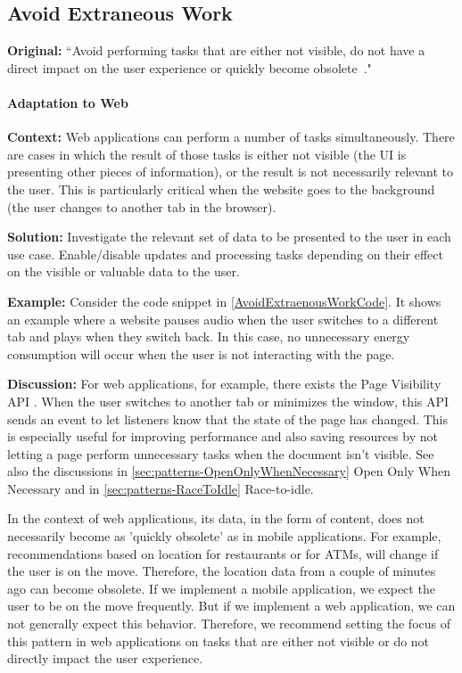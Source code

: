 \subsection{Avoid Extraneous Work}\label{sec:patterns-AvoidExtraneousWork}
\textbf{Original:} ``Avoid performing tasks that are either not visible, do not have a direct impact on the user experience or quickly become obsolete~\cite{cruz2019catalog}."

\paragraph{Adaptation to Web}\mbox{}

\textbf{Context:} Web applications can perform a number of tasks simultaneously. There are cases in which the result of those tasks is either not visible (\eg the UI is presenting other pieces of information), or the result is not necessarily relevant to the user. This is particularly critical when the website goes to the background (\eg the user changes to another tab in the browser).

\textbf{Solution:} Investigate the relevant set of data to be presented to the user in each use case. Enable/disable updates and processing tasks depending on their effect on the visible or valuable data to the user.

\textbf{Example:} Consider the code snippet in \autoref{AvoidExtraenousWorkCode}. It shows an example where a website pauses audio when the user switches to a different tab and plays when they switch back. In this case, no unnecessary energy consumption will occur when the user is not interacting with the page.

\textbf{Discussion:} For web applications, for example, there exists the Page Visibility API \cite{MozillaAPI}. When the user switches to another tab or minimizes the window, this API sends an event to let listeners know that the state of the page has changed. This is especially useful for improving performance and also saving resources by not letting a page perform unnecessary tasks when the document isn't visible. See also the discussions in \ref{sec:patterns-OpenOnlyWhenNecessary} Open Only When Necessary and in \ref{sec:patterns-RaceToIdle} Race-to-idle.

In the context of web applications, its data, in the form of content, does not necessarily become as 'quickly obsolete' as in mobile applications. For example, recommendations based on location \eg for restaurants or for ATMs, will change if the user is on the move. Therefore, the location data from a couple of minutes ago can become obsolete. If we implement a mobile application, we expect the user to be on the move frequently. But if we implement a web application, we can not generally expect this behavior. Therefore, we recommend setting the focus of this pattern in web applications on tasks that are either not visible or do not directly impact the user experience.

